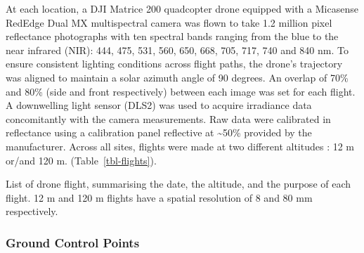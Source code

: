 \documentclass[
  number]{elsarticle}
\begin{document}
At each location, a DJI Matrice 200 quadcopter drone equipped with a
Micasense RedEdge Dual MX multispectral camera was flown to take 1.2
million pixel reflectance photographs with ten spectral bands ranging
from the blue to the near infrared (NIR): 444, 475, 531, 560, 650, 668,
705, 717, 740 and 840 nm. To ensure consistent lighting conditions
across flight paths, the drone's trajectory was aligned to maintain a
solar azimuth angle of 90 degrees. An overlap of 70\% and 80\% (side and
front respectively) between each image was set for each flight. A
downwelling light sensor (DLS2) was used to acquire irradiance data
concomitantly with the camera measurements. Raw data were calibrated in
reflectance using a calibration panel reflective at \textasciitilde50\%
provided by the manufacturer. Across all sites, flights were made at two
different altitudes : 12 m or/and 120 m. (Table~\ref{tbl-flights}).

\begin{table}

\caption{\label{tbl-flights}List of drone flight, summarising the date,
the altitude, and the purpose of each flight. 12 m and 120 m flights
have a spatial resolution of 8 and 80 mm respectively.}


\end{table}%

\subsubsection{Ground Control Points}\label{ground-control-points}
\end{document}
